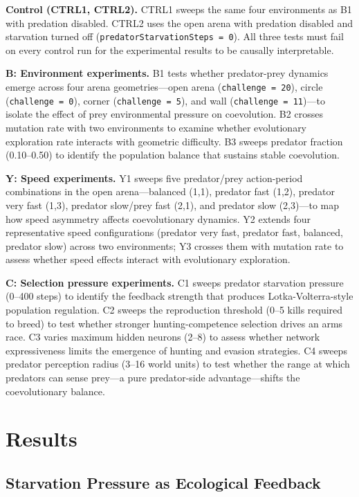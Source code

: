 \documentclass[11pt]{article}
\begin{document}
\textbf{Control (CTRL1, CTRL2).}
CTRL1 sweeps the same four environments as B1 with predation disabled.
CTRL2 uses the open arena with predation disabled and starvation turned off
(\texttt{predatorStarvationSteps = 0}).
All three tests must fail on every control run for the experimental results to be
causally interpretable.

\textbf{B: Environment experiments.}
B1 tests whether predator-prey dynamics emerge across four arena geometries—open arena
(\texttt{challenge = 20}), circle (\texttt{challenge = 0}), corner
(\texttt{challenge = 5}), and wall (\texttt{challenge = 11})—to isolate the effect of
prey environmental pressure on coevolution.
B2 crosses mutation rate with two environments to examine whether evolutionary exploration
rate interacts with geometric difficulty.
B3 sweeps predator fraction (0.10--0.50) to identify the population balance that sustains
stable coevolution.

\textbf{Y: Speed experiments.}
Y1 sweeps five predator/prey action-period combinations in the open arena—balanced (1,1),
predator fast (1,2), predator very fast (1,3), predator slow/prey fast (2,1), and
predator slow (2,3)—to map how speed asymmetry affects coevolutionary dynamics.
Y2 extends four representative speed configurations (predator very fast, predator fast,
balanced, predator slow) across two environments; Y3 crosses them with mutation rate to
assess whether speed effects interact with evolutionary exploration.

\textbf{C: Selection pressure experiments.}
C1 sweeps predator starvation pressure (0--400 steps) to identify the feedback strength that
produces Lotka-Volterra-style population regulation.
C2 sweeps the reproduction threshold (0--5 kills required to breed) to test whether stronger
hunting-competence selection drives an arms race.
C3 varies maximum hidden neurons (2--8) to assess whether network expressiveness limits the
emergence of hunting and evasion strategies.
C4 sweeps predator perception radius (3--16 world units) to test whether the range at which
predators can sense prey—a pure predator-side advantage—shifts the coevolutionary balance.


\section{Results}
\subsection{Starvation Pressure as Ecological Feedback} %
\end{document}
